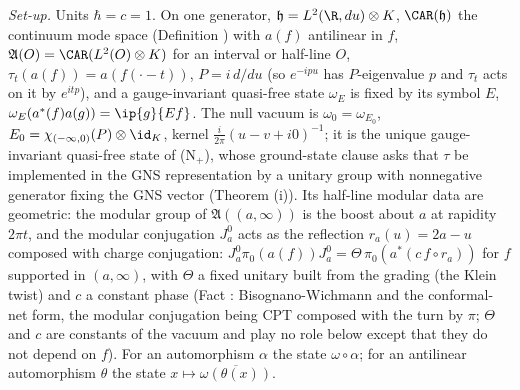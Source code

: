 \emph{Set-up.} Units $\hbar = c = 1$. On one generator, $\mathfrak{h} = L^{2}(\R, du)\otimes K$, $\CAR(\mathfrak{h})$ the continuum mode space (Definition ) with $a(f)$ antilinear in $f$, $\mathfrak{A}(O) = \CAR(L^{2}(O)\otimes K)$ for an interval or half-line $O$, $\tau_{t}(a(f)) = a(f(\cdot - t))$, $P = i\,d/du$ (so $e^{-ipu}$ has $P$-eigenvalue $p$ and $\tau_{t}$ acts on it by $e^{itp}$), and a gauge-invariant quasi-free state $\omega_{E}$ is fixed by its symbol $E$, $\omega_{E}(a^{*}(f)a(g)) = \ip{g}{Ef}$. The null vacuum is $\omega_{0} = \omega_{E_{0}}$, $E_{0} = \chi_{(-\infty,0)}(P)\otimes\id_{K}$, kernel $\tfrac{i}{2\pi}(u - v + i0)^{-1}$; it is the unique gauge-invariant quasi-free state of (N$_{+}$), whose ground-state clause asks that $\tau$ be implemented in the GNS representation by a unitary group with nonnegative generator fixing the GNS vector (Theorem (i)). Its half-line modular data are geometric: the modular group of $\mathfrak{A}((a, \infty))$ is the boost about $a$ at rapidity $2\pi t$, and the modular conjugation $J^{0}_{a}$ acts as the reflection $r_{a}(u) = 2a - u$ composed with charge conjugation: $J^{0}_{a}\pi_{0}(a(f))J^{0}_{a} = \Theta\,\pi_{0}(a^{*}(c\,f\circ r_{a}))$ for $f$ supported in $(a, \infty)$, with $\Theta$ a fixed unitary built from the grading (the Klein twist) and $c$ a constant phase (Fact : Bisognano-Wichmann and the conformal-net form, the modular conjugation being CPT composed with the turn by $\pi$; $\Theta$ and $c$ are constants of the vacuum and play no role below except that they do not depend on $f$). For an automorphism $\alpha$ the state $\omega\circ\alpha$; for an antilinear automorphism $\theta$ the state $x \mapsto \overline{\omega(\theta(x))}$.

